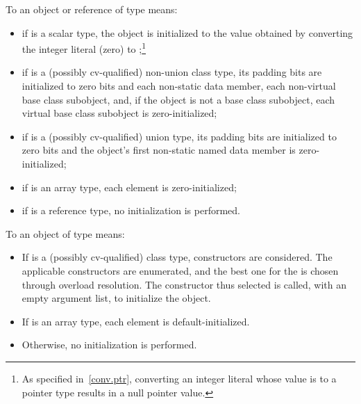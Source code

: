 \pnum
{}%
%
%
%
To
an object or reference of type
means:

\begin{itemize}
\item
if
is a scalar type, the
object
is initialized to the value obtained by converting the integer literal 
(zero) to
;\footnote{As specified in~\ref{conv.ptr}, converting an integer
literal whose value is
to a pointer type results in a null pointer value.
}

\item
if
is a (possibly cv-qualified) non-union class type,
its padding bits are initialized to zero bits and
each non-static data member,
each non-virtual base class subobject, and,
if the object is not a base class subobject,
each virtual base class subobject
is zero-initialized;

\item
if
is a (possibly cv-qualified) union type,
its padding bits are initialized to zero bits and
the
object's first non-static named
data member
is zero-initialized;

\item
if
is an array type,
each element is zero-initialized;
\item
if
is a reference type, no initialization is performed.
\end{itemize}

\pnum
To
an object of type
means:

\begin{itemize}
\item
If
is a (possibly cv-qualified) class type,
constructors are considered. The applicable constructors are
enumerated, and the best one for the
 \tcode{()} is chosen through
overload resolution. The constructor thus selected
is called, with an empty argument list, to initialize the object.

\item
If
is an array type, each element is default-initialized.

\item
Otherwise,
no initialization is performed.
\end{itemize}

